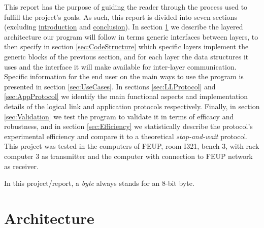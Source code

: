 \documentclass[a4paper, 11pt]{report}
\begin{document}
This report has the purpose of guiding the reader through the process used to fulfill the project's goals. As such, this report is divided into seven sections (excluding \hyperref[sec:Introduction]{introduction} and \hyperref[sec:Conclusion]{conclusion}). In section \ref{sec:Architecture} we describe the layered architecture our program will follow in terms generic interfaces between layers, to then specify in section \ref{sec:CodeStructure} which specific layers implement the generic blocks of the previous section, and for each layer the data structures it uses and the interface it will make available for inter-layer communication. Specific information for the end user on the main ways to use the program is presented in section \ref{sec:UseCases}. In sections \ref{sec:LLProtocol} and \ref{sec:AppProtocol} we identify the main functional aspects and implementation details of the logical link and application protocols respectively. Finally, in section \ref{sec:Validation} we test the program to validate it in terms of efficacy and robustness, and in section \ref{sec:Efficiency} we statistically describe the protocol's experimental efficiency and compare it to a theoretical \textit{stop-and-wait} protocol. This project was tested in the computers of FEUP, room I321, bench 3, with rack computer 3 as transmitter and the computer with connection to FEUP network as receiver.

In this project/report, a \textit{byte} always stands for an 8-bit byte.

\section{Architecture} \label{sec:Architecture}
\end{document}
